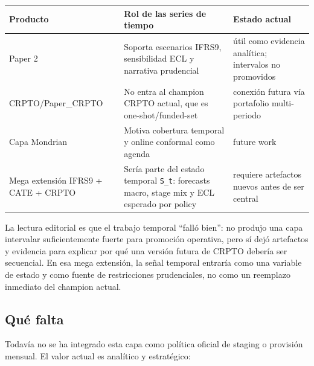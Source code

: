 \documentclass[
  spanish,
  11pt,
  letterpaper,
]{scrbook}
\newcounter{none} %
\theoremstyle{plain}
\theoremstyle{remark}
\begin{document}
{\def\LTcaptype{none} %
\begin{longtable}[]{@{}
  >{\raggedright\arraybackslash}p{}
  >{\raggedright\arraybackslash}p{}
  >{\raggedright\arraybackslash}p{}@{}}
\toprule\noalign{}
\begin{minipage}[b]{\linewidth}\raggedright
Producto
\end{minipage} & \begin{minipage}[b]{\linewidth}\raggedright
Rol de las series de tiempo
\end{minipage} & \begin{minipage}[b]{\linewidth}\raggedright
Estado actual
\end{minipage} \\
\midrule\noalign{}
\endhead
\bottomrule\noalign{}
\endlastfoot
Paper 2 & Soporta escenarios IFRS9, sensibilidad ECL y narrativa
prudencial & útil como evidencia analítica; intervalos no promovidos \\
CRPTO/Paper\_CRPTO & No entra al champion CRPTO actual, que es
one-shot/funded-set & conexión futura vía portafolio multi-periodo \\
Capa Mondrian & Motiva cobertura temporal y online conformal como agenda
& future work \\
Mega extensión IFRS9 + CATE + CRPTO & Sería parte del estado temporal
\texttt{S\_t}: forecasts macro, stage mix y ECL esperado por policy &
requiere artefactos nuevos antes de ser central \\
\end{longtable}
}

La lectura editorial es que el trabajo temporal ``falló bien'': no
produjo una capa intervalar suficientemente fuerte para promoción
operativa, pero sí dejó artefactos y evidencia para explicar por qué una
versión futura de CRPTO debería ser secuencial. En esa mega extensión,
la señal temporal entraría como una variable de estado y como fuente de
restricciones prudenciales, no como un reemplazo inmediato del champion
actual.

\subsection{Qué falta}\label{quuxe9-falta}

Todavía no se ha integrado esta capa como política oficial de staging o
provisión mensual. El valor actual es analítico y estratégico:
\end{document}
